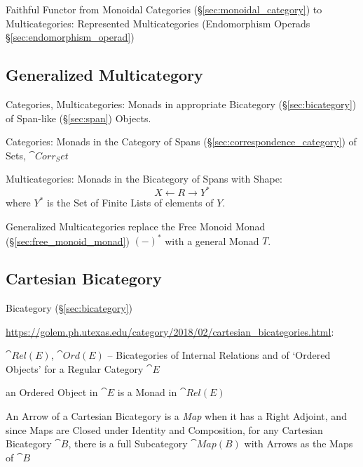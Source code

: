 Faithful Functor from Monoidal Categories
(\S\ref{sec:monoidal_category}) to Multicategories: Represented
Multicategories (Endomorphism Operads \S\ref{sec:endomorphism_operad})



\subsection{Generalized Multicategory}
\label{sec:generalized_multicategory}

Categories, Multicategories: Monads in appropriate Bicategory
(\S\ref{sec:bicategory}) of Span-like (\S\ref{sec:span}) Objects.

Categories: Monads in the Category of Spans
(\S\ref{sec:correspondence_category}) of Sets, $\cat{Corr_Set}$

Multicategories: Monads in the Bicategory of Spans with Shape:
\[
  X \leftarrow R \rightarrow Y^*
\]
where $Y^*$ is the Set of Finite Lists of elements of $Y$.

Generalized Multicategories replace the Free Monoid Monad
(\S\ref{sec:free_monoid_monad}) $(-)^*$ with a general Monad $T$.



\subsection{Cartesian Bicategory}\label{sec:cartesian_bicategory}

Bicategory (\S\ref{sec:bicategory})

\url{https://golem.ph.utexas.edu/category/2018/02/cartesian_bicategories.html}:

$\cat{Rel(E)}$, $\cat{Ord(E)}$ -- Bicategories of Internal Relations and of
`Ordered Objects' for a Regular Category $\cat{E}$

an Ordered Object in $\cat{E}$ is a Monad in $\cat{Rel(E)}$

An Arrow of a Cartesian Bicategory is a \emph{Map} when it has a Right Adjoint,
and since Maps are Closed under Identity and Composition, for any Cartesian
Bicategory $\cat{B}$, there is a full Subcategory $\cat{Map(B)}$ with Arrows as
the Maps of $\cat{B}$

